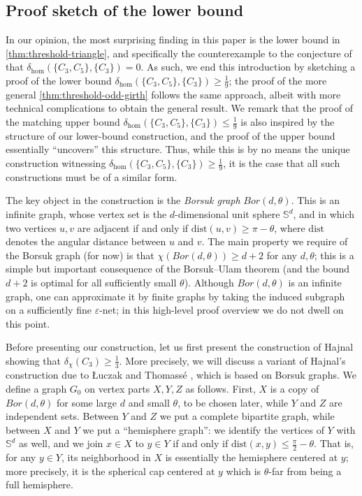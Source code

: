 \documentclass{article}
\newcommand{\dist}{\text{dist}}
\begin{document}
\subsection{Proof sketch of the lower bound}
In our opinion, the most surprising finding in this paper is the lower bound in \cref{thm:threshold-triangle}, and specifically the counterexample to the conjecture of \cite{GHW26} that $\delta_{\hom}(\{C_3,C_5\},\{C_3\})=0$. As such, we end this introduction by sketching a proof of the lower bound $\delta_{\hom}(\{C_3,C_5\},\{C_3\})\geq \frac 19$; the proof of the more general \cref{thm:threshold-odd-girth} follows the same approach, albeit with more technical complications to obtain the general result. We remark that the proof of the matching upper bound $\delta_{\hom}(\{C_3,C_5\},\{C_3\})\leq \frac 19$ is also inspired by the structure of our lower-bound construction, and the proof of the upper bound essentially ``uncovers'' this structure. Thus, while this is by no means the unique construction witnessing $\delta_{\hom}(\{C_3,C_5\},\{C_3\})\geq \frac{1}{9}$, it is the case that all such constructions must be of a similar form.

The key object in the construction is the \emph{Borsuk graph} $Bor(d,\theta)$. This is an infinite graph, whose vertex set is the $d$-dimensional unit sphere $\mathbb S^d$, and in which two vertices $u,v$ are adjacent if and only if $\dist(u,v)\geq \pi-\theta$, where $\dist$ denotes the angular distance between $u$ and $v$. The main property we require of the Borsuk graph (for now) is that $\chi(Bor(d,\theta))\geq d+2$ for any $d,\theta$; this is a simple but important consequence of the Borsuk--Ulam theorem \cite{B33} (and the bound $d+2$ is optimal for all sufficiently small $\theta$). Although $Bor(d,\theta)$ is an infinite graph, one can approximate it by finite graphs by taking the induced subgraph on a sufficiently fine $\varepsilon$-net; in this high-level proof overview we do not dwell on this point.

Before presenting our construction, let us first present the construction of Hajnal showing that $\delta_\chi(C_3)\geq \frac 13$. More precisely, we will discuss a variant of Hajnal's construction due to \L uczak and Thomass\'e \cite{1007.1670}, which is based on Borsuk graphs. We define a graph $G_0$ on vertex parts $X,Y,Z$
as follows. First, $X$ is a copy of $Bor(d,\theta)$ for some large $d$ and small $\theta$, to be chosen later, while $Y$ and $Z$ are independent sets. Between $Y$ and $Z$ we put a complete bipartite graph, while between $X$ and $Y$ we put a ``hemisphere graph'': we identify the vertices of $Y$ with $\mathbb S^d$ as well, and we join $x \in X$ to $y \in Y$ if and only if $\dist(x,y) \leq \frac{\pi}2-\theta$. That is, for any $y \in Y$, its neighborhood in $X$ is essentially the hemisphere centered at $y$; more precisely, it is the spherical cap centered at $y$ which is $\theta$-far from being a full hemisphere. 
\end{document}
